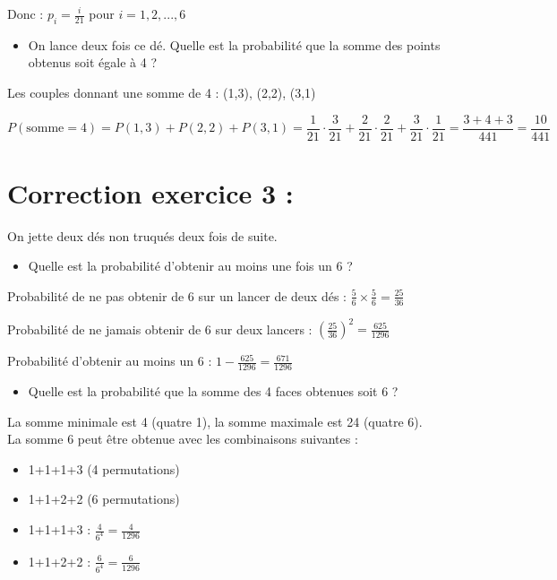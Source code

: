 Donc : \(p_i = \frac{i}{21}\) pour \(i = 1, 2, ..., 6\)

\begin{itemize}
\item On lance deux fois ce dé. Quelle est la probabilité que la somme des points obtenus soit égale à 4 ?
\end{itemize}

Les couples donnant une somme de 4 : (1,3), (2,2), (3,1)

\[P(\text{somme}=4) = P(1,3) + P(2,2) + P(3,1) = \frac{1}{21} \cdot \frac{3}{21} + \frac{2}{21} \cdot \frac{2}{21} + \frac{3}{21} \cdot \frac{1}{21} = \frac{3+4+3}{441} = \frac{10}{441}\]

\section*{Correction exercice 3 :}

On jette deux dés non truqués deux fois de suite.

\begin{itemize}
    \item Quelle est la probabilité d'obtenir au moins une fois un 6 ?
\end{itemize}

Probabilité de ne pas obtenir de 6 sur un lancer de deux dés : \(\frac{5}{6} \times \frac{5}{6} = \frac{25}{36}\)

Probabilité de ne jamais obtenir de 6 sur deux lancers : \((\frac{25}{36})^2 = \frac{625}{1296}\)

Probabilité d'obtenir au moins un 6 : \(1 - \frac{625}{1296} = \frac{671}{1296}\)

\begin{itemize}
    \item Quelle est la probabilité que la somme des 4 faces obtenues soit 6 ?
\end{itemize}

La somme minimale est 4 (quatre 1), la somme maximale est 24 (quatre 6).\\
La somme 6 peut être obtenue avec les combinaisons suivantes :
\begin{itemize}
    \item 1+1+1+3 (4 permutations)
    \item 1+1+2+2 (6 permutations)
    \item 1+1+1+3 : \(\frac{4}{6^4} = \frac{4}{1296}\)
    \item 1+1+2+2 : \(\frac{6}{6^4} = \frac{6}{1296}\)
\end{itemize}

